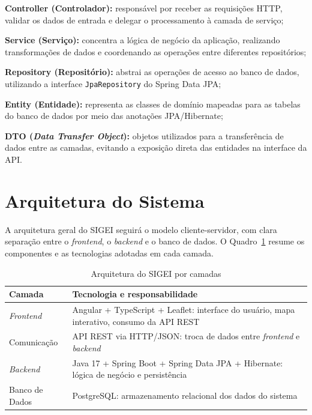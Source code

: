\documentclass[12pt,a4paper,oneside]{abntspiifac}
\begin{document}
\begin{alineas}
  \item \textbf{Controller (Controlador):} responsável por receber as requisições HTTP, validar os dados de entrada e delegar o processamento à camada de serviço;
  \item \textbf{Service (Serviço):} concentra a lógica de negócio da aplicação, realizando transformações de dados e coordenando as operações entre diferentes repositórios;
  \item \textbf{Repository (Repositório):} abstrai as operações de acesso ao banco de dados, utilizando a interface \texttt{JpaRepository} do Spring Data JPA;
  \item \textbf{Entity (Entidade):} representa as classes de domínio mapeadas para as tabelas do banco de dados por meio das anotações JPA/Hibernate;
  \item \textbf{DTO (\textit{Data Transfer Object}):} objetos utilizados para a transferência de dados entre as camadas, evitando a exposição direta das entidades na interface da API.
\end{alineas}

\section{Arquitetura do Sistema}

A arquitetura geral do SIGEI seguirá o modelo cliente-servidor, com clara separação entre o \textit{frontend}, o \textit{backend} e o banco de dados. O Quadro~\ref{qua:arq} resume os componentes e as tecnologias adotadas em cada camada.

\begin{table}[H]
\centering
\caption{Arquitetura do SIGEI por camadas}
\label{qua:arq}
\begin{tabularx}{\textwidth}{lX}
\toprule
\textbf{Camada} & \textbf{Tecnologia e responsabilidade} \\
\midrule
\textit{Frontend}       & Angular + TypeScript + Leaflet: interface do usuário, mapa interativo, consumo da API REST \\[4pt]
Comunicação             & API REST via HTTP/JSON: troca de dados entre \textit{frontend} e \textit{backend} \\[4pt]
\textit{Backend}        & Java 17 + Spring Boot + Spring Data JPA + Hibernate: lógica de negócio e persistência \\[4pt]
Banco de Dados          & PostgreSQL: armazenamento relacional dos dados do sistema \\
\bottomrule
\end{tabularx}
\end{table}
\end{document}
